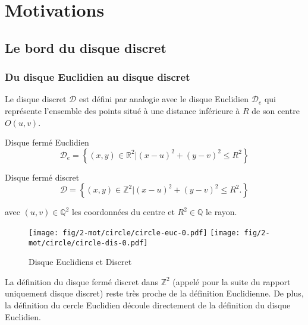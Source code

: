 \section{Motivations}

\subsection{Le bord du disque discret}

\subsubsection{Du disque Euclidien au disque discret}


Le disque discret $\mathcal{D}$ est défini par analogie avec le disque Euclidien $\mathcal{D}_e$ qui représente l'ensemble des points situé à une distance inférieure à $R$ de son centre $O(u,v)$.


\begin{Definition}{Disque fermé Euclidien}
\label{def:disk-euc}
 $$\mathcal{D}_e =  \left\{ (x,y) \in \mathbb{R}^{2} |  (x - u)^2 + (y - v)^2 \leq R^2 \right\}$$
\end{Definition}

\begin{Definition}{Disque fermé discret}
\label{def:disk-dis}
  $$\mathcal{D} =  \left\{ (x,y) \in \mathbb{Z}^{2} |  (x - u)^2 + (y - v)^2 \leq R^2. \right\}$$
  
  avec $(u,v) \in \mathbb{Q}^{2}$ les coordonnées du centre et $R^2 \in \mathbb{Q}$ le rayon.\\
\end{Definition}

\begin{figure}[H]
  \centering
  \texttt{[image: fig/2-mot/circle/circle-euc-0.pdf]}
  \texttt{[image: fig/2-mot/circle/circle-dis-0.pdf]}
  \caption{Disque Euclidiens et Discret}
\end{figure}

La définition du disque fermé discret dans $\mathbb{Z}^{2}$ (appelé pour la suite du rapport uniquement disque discret) reste très proche de la définition Euclidienne. De plus, la définition du cercle Euclidien découle directement de la définition du disque Euclidien.

